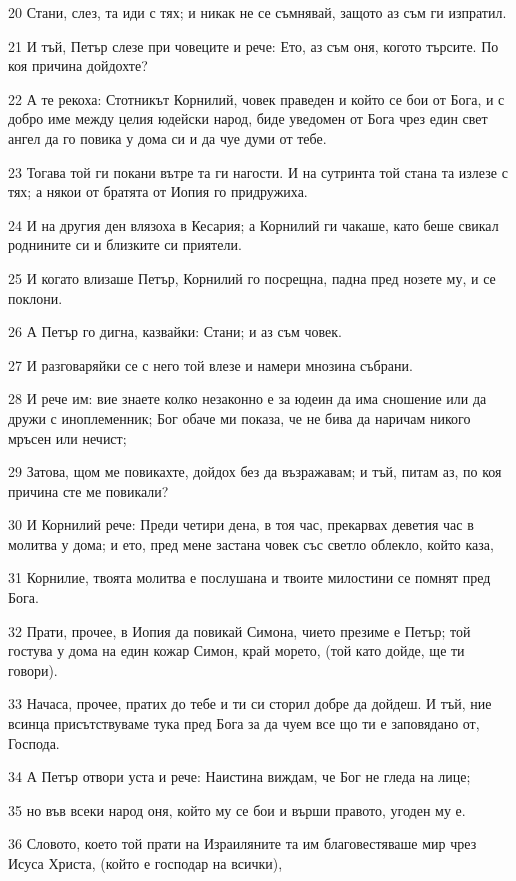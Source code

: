 \par 20 Стани, слез, та иди с тях; и никак не се съмнявай, защото аз съм ги изпратил.
\par 21 И тъй, Петър слезе при човеците и рече: Ето, аз съм оня, когото търсите. По коя причина дойдохте?
\par 22 А те рекоха: Стотникът Корнилий, човек праведен и който се бои от Бога, и с добро име между целия юдейски народ, биде уведомен от Бога чрез един свет ангел да го повика у дома си и да чуе думи от тебе.
\par 23 Тогава той ги покани вътре та ги нагости. И на сутринта той стана та излезе с тях; а някои от братята от Иопия го придружиха.
\par 24 И на другия ден влязоха в Кесария; а Корнилий ги чакаше, като беше свикал роднините си и близките си приятели.
\par 25 И когато влизаше Петър, Корнилий го посрещна, падна пред нозете му, и се поклони.
\par 26 А Петър го дигна, казвайки: Стани; и аз съм човек.
\par 27 И разговаряйки се с него той влезе и намери мнозина събрани.
\par 28 И рече им: вие знаете колко незаконно е за юдеин да има сношение или да дружи с иноплеменник; Бог обаче ми показа, че не бива да наричам никого мръсен или нечист;
\par 29 Затова, щом ме повикахте, дойдох без да възражавам; и тъй, питам аз, по коя причина сте ме повикали?
\par 30 И Корнилий рече: Преди четири дена, в тоя час, прекарвах деветия час в молитва у дома; и ето, пред мене застана човек със светло облекло, който каза,
\par 31 Корнилие, твоята молитва е послушана и твоите милостини се помнят пред Бога.
\par 32 Прати, прочее, в Иопия да повикай Симона, чието презиме е Петър; той гостува у дома на един кожар Симон, край морето, (той като дойде, ще ти говори).
\par 33 Начаса, прочее, пратих до тебе и ти си сторил добре да дойдеш. И тъй, ние всинца присътствуваме тука пред Бога за да чуем все що ти е заповядано от, Господа.
\par 34 А Петър отвори уста и рече: Наистина виждам, че Бог не гледа на лице;
\par 35 но във всеки народ оня, който му се бои и върши правото, угоден му е.
\par 36 Словото, което той прати на Израиляните та им благовестяваше мир чрез Исуса Христа, (който е господар на всички),
